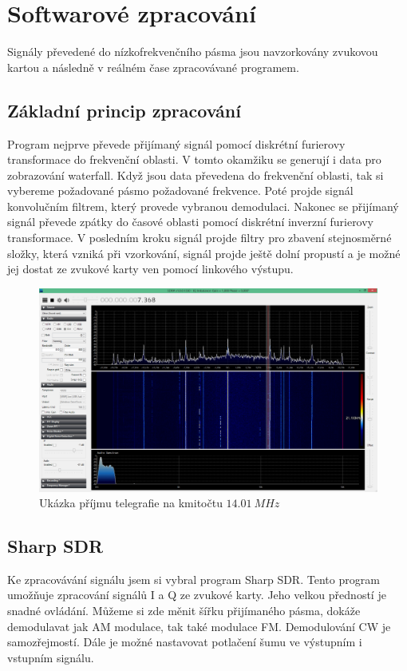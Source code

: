 \clearpage
\section{Softwarové zpracování}
\indent\indent Signály převedené do nízkofrekvenčního pásma jsou navzorkovány zvukovou kartou a následně v reálném čase zpracovávané programem.
\subsection{Základní princip zpracování}
\indent\indent Program nejprve převede přijímaný signál pomocí diskrétní furierovy transformace do frekvenční oblasti. V tomto okamžiku se generují i data pro zobrazování waterfall. Když jsou data převedena do frekvenční oblasti, tak si vybereme požadované pásmo požadované frekvence. Poté projde signál konvolučním filtrem, který provede vybranou demodulaci. Nakonec se přijímaný signál převede zpátky do časové oblasti pomocí diskrétní inverzní furierovy transformace. V posledním kroku signál projde filtry pro zbavení stejnosměrné složky, která vzniká při vzorkování, signál projde ještě dolní propustí a je možné jej dostat ze zvukové karty ven pomocí linkového výstupu.

\begin{figure}[H]
	\centering
	\includegraphics[width=170mm]{img/prijem.png}
	\caption{Ukázka příjmu telegrafie na kmitočtu $14.01~MHz$}    		
\end{figure}

\subsection{Sharp SDR}
\indent\indent Ke zpracovávání signálu jsem si vybral program Sharp SDR. Tento program umožňuje zpracování signálů I a Q ze zvukové karty. Jeho velkou předností je snadné ovládání. Můžeme si zde měnit šířku přijímaného pásma, dokáže demodulavat jak AM modulace, tak také modulace FM. Demodulování CW je samozřejmostí. Dále je možné nastavovat potlačení šumu ve výstupním i vstupním signálu.